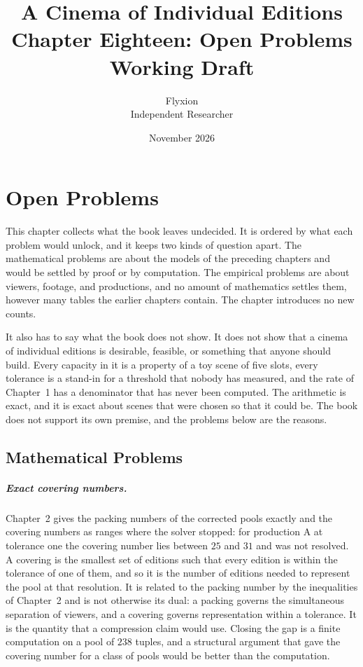 \documentclass[11pt,twoside,openright]{book}
\title{\Huge\bfseries A Cinema of Individual Editions\\[1.2ex]
\large Chapter Eighteen: Open Problems\\[0.4ex]
\large Working Draft}
\author{Flyxion\\[0.3ex]\small Independent Researcher}
\date{November 2026}
\theoremstyle{plain}
\theoremstyle{definition}
\theoremstyle{remark}
\begin{document}
\frontmatter
\maketitle
\tableofcontents
\mainmatter
\setcounter{chapter}{17}

\chapter{Open Problems}
\label{ch:open}

This chapter collects what the book leaves undecided. It is ordered by what each problem would unlock, and it keeps two kinds of question apart. The mathematical problems are about the models of the preceding chapters and would be settled by proof or by computation. The empirical problems are about viewers, footage, and productions, and no amount of mathematics settles them, however many tables the earlier chapters contain. The chapter introduces no new counts.

It also has to say what the book does not show. It does not show that a cinema of individual editions is desirable, feasible, or something that anyone should build. Every capacity in it is a property of a toy scene of five slots, every tolerance is a stand-in for a threshold that nobody has measured, and the rate of Chapter~1 has a denominator that has never been computed. The arithmetic is exact, and it is exact about scenes that were chosen so that it could be. The book does not support its own premise, and the problems below are the reasons.

\section{Mathematical Problems}\label{sec:math18}

\paragraph{Exact covering numbers.} Chapter~2 gives the packing numbers of the corrected pools exactly and the covering numbers as ranges where the solver stopped: for production A at tolerance one the covering number lies between $25$ and $31$ and was not resolved. A covering is the smallest set of editions such that every edition is within the tolerance of one of them, and so it is the number of editions needed to represent the pool at that resolution. It is related to the packing number by the inequalities of Chapter~2 and is not otherwise its dual: a packing governs the simultaneous separation of viewers, and a covering governs representation within a tolerance. It is the quantity that a compression claim would use. Closing the gap is a finite computation on a pool of $238$ tuples, and a structural argument that gave the covering number for a class of pools would be better than the computation.
\end{document}

